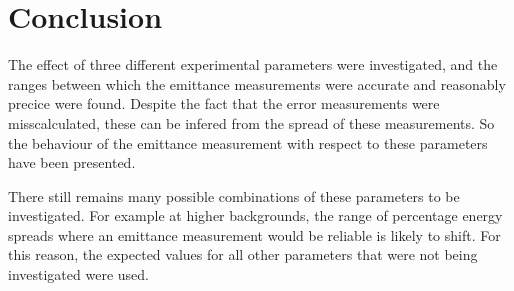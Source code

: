 
\section{Conclusion}
\label{sec:conclusion}

The effect of three different experimental parameters were investigated, and
the ranges between which the emittance measurements were accurate and reasonably
precice were found. Despite the fact that the error measurements were
misscalculated, these can be infered from the spread of these measurements.
So the behaviour of the emittance measurement with respect to these parameters
have been presented.

There still remains many possible combinations of these parameters to be
investigated. For example at higher backgrounds, the range of percentage energy
spreads where an emittance measurement would be reliable is likely to shift. For
this reason, the expected values for all other parameters that were not being
investigated were used.

